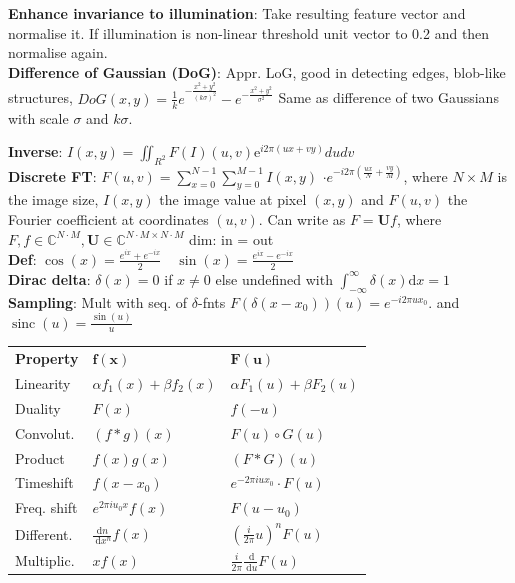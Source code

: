 \textbf{Enhance invariance to illumination}: Take resulting feature vector and normalise it. If illumination is non-linear threshold unit vector to 0.2 and then normalise again. \\
\textbf{Difference of Gaussian (DoG)}: Appr. LoG, good in detecting edges, blob-like structures, $D o G(x, y)=\frac{1}{k} e^{-\frac{x^2+y^2}{(k \sigma)^2}}-e^{-\frac{x^2+y^2}{\sigma^2}}$ Same as difference of two Gaussians with scale $\sigma$ and $k\sigma$.



\textbf{Inverse}:
$I(x, y)=\iint_{R^2} F(I)(u, v) \mathrm{e}^{i 2 \pi(u x+v y)} d u d v$\\
\textbf{Discrete FT}: $F(u, v)=\sum_{x=0}^{N-1} \sum_{y=0}^{M-1} I(x,y)$  $\cdot e^{-i 2 \pi\left(\frac{u x}{N}+\frac{v y}{M}\right)}$, where $N \times M$ is the image size, $I(x, y)$ the image value at pixel $(x, y)$ and $F(u, v)$ the Fourier coefficient at coordinates $(u, v)$. Can write as $F=\mathbf{U}f$, where $F,f\in \mathbb{C}^{N\cdot M},\mathbf{U}\in \mathbb{C}^{N\cdot M \times N\cdot M}$ dim: in = out\\


\textbf{Def}: $\cos (x)=\frac{e^{i x}+e^{-i x}}{2} \quad \sin (x)=\frac{e^{i x}-e^{-i x}}{2}$ \\ \textbf{Dirac delta}: $\delta(x)=0$ if $x \neq 0$ else undefined with $\int_{-\infty}^{\infty} \delta(x) \mathrm{d} x=1$\\
 
\textbf{Sampling}: Mult with seq. of $\delta$-fnts $F\left(\delta\left(x-x_0\right)\right)(u)=e^{-i 2 \pi u x_0}$. and $\operatorname{sinc}(u)=\frac{\sin (u)}{u}$


\begin{tabular}{lll} 
\textbf{Property }& $\boldsymbol{f}(\boldsymbol{x})$ & $\boldsymbol{F}(\boldsymbol{u})$ \\
Linearity & $\alpha f_1(x)+\beta f_2(x)$ & $\alpha F_1(u)+\beta F_2(u)$ \\
Duality & $F(x)$ & $f(-u)$ \\
Convolut. & $(f * g)(x)$ & $F(u) \circ G(u)$ \\
Product & $f(x) g(x)$ & $(F * G)(u)$ \\
Timeshift & $f\left(x-x_0\right)$ & $e^{-2 \pi i u x_0} \cdot F(u)$ \\
Freq. shift & $e^{2 \pi i u_0 x} f(x)$ & $F\left(u-u_0\right)$ \\
Different. & $\frac{\mathrm{d} n}{\mathrm{~d} x^n} f(x)$ & $\left(\frac{i}{2 \pi} u\right)^n F(u)$ \\
Multiplic. & $x f(x)$ & $\frac{i}{2 \pi} \frac{\mathrm{~d}}{\mathrm{~d} u} F(u)$
\end{tabular}

